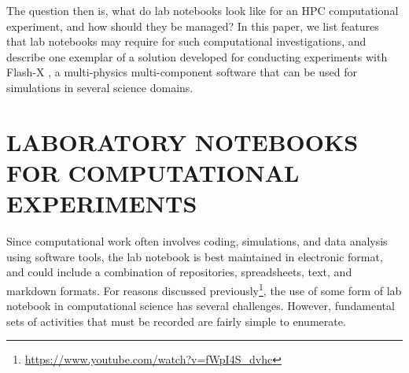 \documentclass{IEEEcsmag}
\begin{document}
 
 The question then is, what do lab notebooks look like for an HPC computational experiment, and how should they be managed? In this paper, we list features that lab notebooks may require for such computational investigations, and describe one exemplar of a  solution developed for conducting experiments with Flash-X \cite{DUBEY2022101168}, a multi-physics multi-component software that can be used for simulations in several science domains.

\section{LABORATORY NOTEBOOKS FOR COMPUTATIONAL EXPERIMENTS}
Since computational work often involves coding, simulations, and data
analysis using software tools, the lab notebook is best maintained in
electronic format, and could include a combination of repositories,
spreadsheets, text, and markdown formats. 
{For reasons discussed previously\footnote{\url{https://www.youtube.com/watch?v=fWpI4S_dvhc}}}, the use of some form of
lab notebook in computational science has several challenges.
{However, fundamental sets of activities that must be recorded are fairly
simple to enumerate}. 
\end{document}
